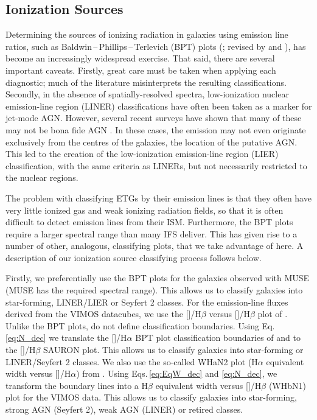 \documentclass[a4paper,fleqn,usenatbib]{mnras}
\begin{document}
	\subsection{Ionization Sources}
		\label{subsec:Diagnostics}
		Determining the sources of ionizing radiation in galaxies using emission line ratios, such as Baldwin\,--\,Phillips\,--\,Terlevich (BPT) plots (\citealt{Baldwin1981}; revised by \citealt{Kewley2001, Kewley2006} and \citealt{Kauffmann2003a}), has become an increasingly widespread exercise. That said, there are several important caveats. Firstly, great care must be taken when applying each diagnostic; much of the literature misinterprets the resulting classifications. Secondly, in the absence of spatially-resolved spectra, low-ionization nuclear emission-line region (LINER) classifications have often been taken as a marker for jet-mode AGN. However, several recent surveys have shown that many of these may not be bona fide AGN \citep[e.g.][]{Sarzi2005, Sarzi2010, Singh2013, Belfiore2016a}. In these cases, the emission may not even originate exclusively from the centres of the galaxies, the location of the putative AGN. This led to the creation of the low-ionization emission-line region (LIER) classification, with the same criteria as LINERs, but not necessarily restricted to the nuclear regions.

		The problem with classifying ETGs by their emission lines is that they often have very little ionized gas and weak ionizing radiation fields, so that it is often difficult to detect emission lines from their ISM. Furthermore, the BPT plots require a larger spectral range than many IFS deliver. This has given rise to a number of other, analogous, classifying plots, that we take advantage of here. A description of our ionization source classifying process follows below. 

		Firstly, we preferentially use the BPT plots for the galaxies observed with MUSE (MUSE has the required spectral range). This allows us to classify galaxies into star-forming, LINER/LIER or Seyfert 2 classes. For the emission-line fluxes derived from the VIMOS datacubes, we use the []/H$\beta$ versus []/H$\beta$ plot of \citet[hereafter the SAURON plot]{Sarzi2010}. Unlike the BPT plots, \citet{Sarzi2010} do not define classification boundaries. Using Eq.\,\ref{eq:N_dec} we translate the []/H$\alpha$ BPT plot classification boundaries of \citet{Kewley2001} and \citet{Kauffmann2003a} to the []/H$\beta$ SAURON plot. This allows us to classify galaxies into star-forming or LINER/Seyfert 2 classes. We also use the so-called WHaN2 plot (H$\alpha$ equivalent width versus []/H$\alpha$) from \citet{CidFernandes2011}. Using Eqs.\,\ref{eq:EqW_dec} and \ref{eq:N_dec}, we transform the boundary lines into a H$\beta$ equivalent width versus []/H$\beta$ (WHbN1) plot for the VIMOS data. This allows us to classify galaxies into star-forming, strong AGN (Seyfert 2), weak AGN (LINER) or retired classes. 
\end{document}
